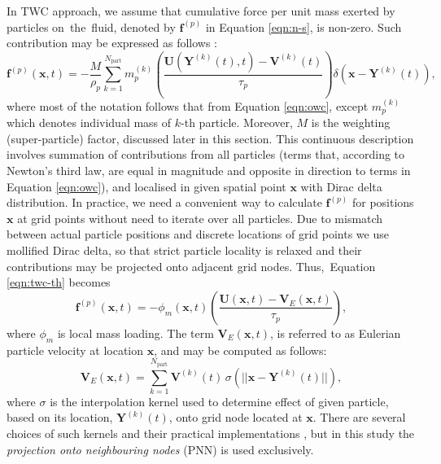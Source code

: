 \documentclass{pracamgren}
\begin{document}
In TWC approach, we assume that cumulative force per unit mass exerted by particles on~the~fluid, denoted by $\mathbf{f}^{(p)}$ in Equation \ref{eqn:n-s}, is non-zero.
Such contribution may be expressed as follows \parencite{Bosse2006,Monchaux2017,Rosa2022}:
\begin{equation}
\mathbf{f}^{(p)}(\mathbf{x}, t) = - \frac{M}{\rho_{p}} \sum_{k=1}^{N_{\text{part}}} m^{(k)}_{p} \left( \frac{ \mathbf{U}(\mathbf{Y}^{(k)}(t), t) - \mathbf{V}^{(k)}(t) }{\tau_{p}} \right) \delta \left( \mathbf{x} - \mathbf{Y}^{(k)}(t) \right) ,
\label{eqn:twc-th}
\end{equation}
where most of the notation follows that from Equation \ref{eqn:owc}, except $m^{(k)}_{p}$ which denotes individual mass of $k$-th particle.
Moreover, $M$ is the weighting (super-particle) factor, discussed later in this section.
This continuous description involves summation of contributions from all particles (terms that, according to Newton's third law, are equal in magnitude and opposite in direction to terms in Equation \ref{eqn:owc}), and localised in given spatial point $\mathbf{x}$ with Dirac delta distribution.
In practice, we need a convenient way to calculate $\mathbf{f}^{(p)}$ for positions $\mathbf{x}$ at grid points without need to iterate over all particles.
Due to mismatch between actual particle positions and discrete locations of grid points we use mollified Dirac delta, so that strict particle locality is relaxed and their contributions may be projected onto adjacent grid nodes.
Thus,~Equation \ref{eqn:twc-th} becomes
\begin{equation}
\mathbf{f}^{(p)}(\mathbf{x}, t) = - \phi_{m}(\mathbf{x}, t) \left( \frac{ \mathbf{U}(\mathbf{x}, t) - \mathbf{V}_{E}(\mathbf{x}, t)}{\tau_{p}} \right) ,
\label{eqn:twc-px}
\end{equation}  
where $\phi_{m}$ is local mass loading. 
The term $\mathbf{V}_{E}(\mathbf{x}, t)$, is referred to as Eulerian particle velocity at location $\mathbf{x}$, and may be computed as follows:
\begin{equation}
\mathbf{V}_{E}(\mathbf{x}, t) = \sum_{k=1}^{N_{\text{part}}} \mathbf{V}^{(k)}(t) \, \sigma(|| \mathbf{x} - \mathbf{Y}^{(k)}(t) ||) ,
\label{eqn:twc-ve}
\end{equation}
where $\sigma$ is the interpolation kernel used to determine effect of given particle, based on its location, $\mathbf{Y}^{(k)}(t)$, onto grid node located at $\mathbf{x}$.
There are several choices of such kernels and their practical implementations \parencite{Garg2007}, but in this study the \emph{projection onto neighbouring nodes} (PNN) is used exclusively.
\end{document}
